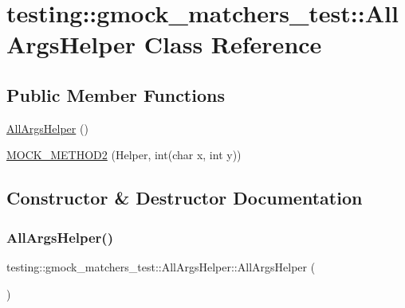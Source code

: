 \hypertarget{classtesting_1_1gmock__matchers__test_1_1_all_args_helper}{}\section{testing\+:\+:gmock\+\_\+matchers\+\_\+test\+:\+:All\+Args\+Helper Class Reference}
\label{classtesting_1_1gmock__matchers__test_1_1_all_args_helper}
\subsection*{Public Member Functions}
\begin{DoxyCompactItemize}
\item 
\hyperlink{classtesting_1_1gmock__matchers__test_1_1_all_args_helper_afffee92e50b5545e5b4be8c989ff63ab}{All\+Args\+Helper} ()
\item 
\hyperlink{classtesting_1_1gmock__matchers__test_1_1_all_args_helper_a571b9c1e5ab4e891085060e73c94be32}{M\+O\+C\+K\+\_\+\+M\+E\+T\+H\+O\+D2} (Helper, int(char x, int y))
\end{DoxyCompactItemize}


\subsection{Constructor \& Destructor Documentation}
\mbox{\label{classtesting_1_1gmock__matchers__test_1_1_all_args_helper_afffee92e50b5545e5b4be8c989ff63ab}} 
\subsubsection{\texorpdfstring{All\+Args\+Helper()}{AllArgsHelper()}}
{\footnotesize\ttfamily testing\+::gmock\+\_\+matchers\+\_\+test\+::\+All\+Args\+Helper\+::\+All\+Args\+Helper (\begin{DoxyParamCaption}{ }\end{DoxyParamCaption})\hspace{0.3cm}{\ttfamily [inline]}}




